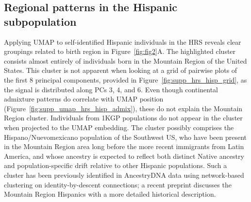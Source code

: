 \subsection{Regional patterns in the Hispanic subpopulation}
Applying UMAP to self-identified Hispanic individuals in the HRS reveals clear groupings related to birth region in Figure~\ref{fig:fig2}A. The highlighted cluster consists almost entirely of individuals born in the Mountain Region of the United States. This cluster is not apparent when looking at a grid of pairwise plots of the first 8 principal components, provided in Figure~\ref{fig:supp_hrs_hisp_grid}, as the signal is distributed along PCs 3, 4, and 6. Even though continental admixture patterns do correlate with UMAP position (Figure~\ref{fig:supp_umap_hrs_hisp_admix}), these do not explain the Mountain Region cluster. Individuals from 1KGP populations do not appear in the cluster when projected to the UMAP embedding. The cluster possibly comprises the Hispano/Nuevomexicano population of the Southwest US, who have been present in the Mountain Region area long before the more recent immigrants from Latin America, and whose ancestry is expected to reflect both distinct Native ancestry and population-specific drift relative to other Hispanic populations. Such a cluster has been previously identified in AncestryDNA data using network-based clustering on identity-by-descent connections\citep{han2017clustering}; a recent preprint discusses the Mountain Region Hispanics with a more detailed historical description\citep{Jordan333609}. 

\clearpage

